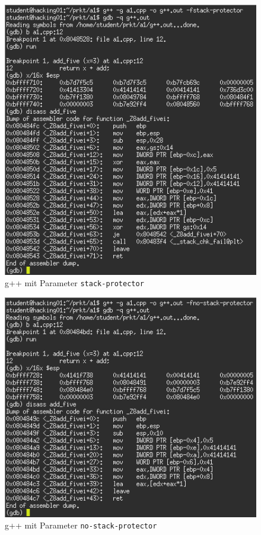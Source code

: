 \documentclass[11pt,a4paper]{article}
\begin{document}
\begin{figure}[h!]
  \caption{g++ mit Parameter \texttt{stack-protector}}
  \label{gpp0}
  \centering
    \includegraphics[scale=1]{2_gpp_protector_0.png}
\end{figure}
\begin{figure}[h!]
  \caption{g++ mit Parameter \texttt{no-stack-protector}}
  \label{gpp1}
  \centering
    \includegraphics[scale=1]{2_gpp_protector_1.png}
\end{figure}
\end{document}
